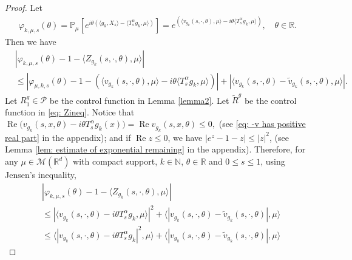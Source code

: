 \documentclass[12pt, a4paper]{amsart}
\theoremstyle{definition}
\numberwithin{equation}{section}
\begin{document}
\begin{proof}
    Let 
\begin{align}
\label{eq: definition of varphi-mu-k-theta}
    \varphi_{k,\mu,s}(\theta)
    =\mathbb{P}_{\mu}[e^{i\theta(\langle g_k, X_s\rangle-\langle T_s^{\alpha}g_k,\mu \rangle)}]
    =e^{(\langle v_{g_k}(s,\cdot,\theta),\mu \rangle-i\theta \langle T_s^{\alpha} g_k, \mu \rangle)},
    \quad \theta \in \mathbb R.
\end{align}
    Then we have
\begin{align*}
    &|\varphi_{k,\mu,s}(\theta)-1-\langle Z_{g_k}(s,\cdot, \theta),\mu\rangle|\\
    &\leq|\varphi_{\mu,k,s}(\theta)-1-\left( \langle v_{g_k}(s,\cdot,\theta), \mu \rangle-i\theta \langle T_s^{\alpha}g_k,\mu\rangle\right)| + |\langle v_{g_k}(s,\cdot,\theta)-\tilde{v}_{g_k}(s,\cdot,\theta),\mu \rangle|.
\end{align*}
    Let $R^g_1\in \mathcal P$ be the control function in Lemma \ref{lemma2}.
    Let $\tilde R^g$ be the control function in \eqref{eq: Zineq}.
    Notice that
$
    \operatorname{Re} \big(v_{g_k}(s,x,\theta) - i\theta T_s^\alpha g_k(x)\big)
    = \operatorname{Re} v_{g_k}(s,x,\theta)
    \leq 0,
$
    (see \eqref{eq: -v has positive real part} in the appendix); and if $ \operatorname{Re} z\leq 0$, we have $|e^z-1-z|\leq |z|^2$, (see Lemma \ref{lem: estimate of exponential remaining} in the appendix).
    Therefore, for any $\mu\in \mathcal M(\mathbb R^d)$ with compact support, $k \in \mathbb{N}$, $\theta \in \mathbb{R}$ and $0\leq s\leq1$, using Jensen's inequality,
\begin{align*}
    &|\varphi_{k,\mu,s}(\theta)-1- \langle Z_{g_k}(s,\cdot, \theta),\mu\rangle|\\
    &\leq |\langle v_{g_k}(s,\cdot,\theta)-i\theta T_s^{\alpha}g_k, \mu \rangle|^2 + \langle |v_{g_k}(s,\cdot,\theta)-\tilde{v}_{g_k}(s,\cdot,\theta)|, \mu \rangle
    \\&\leq \langle |v_{g_k}(s,\cdot,\theta)-i\theta T_s^{\alpha}g_k|^2, \mu \rangle + \langle |v_{g_k}(s,\cdot,\theta)-\tilde{v}_{g_k}(s,\cdot,\theta)|, \mu \rangle

\end{align*}
\end{proof}
\end{document}
